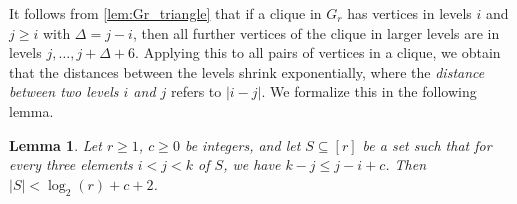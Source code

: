 \documentclass[11pt]{article}
\newtheorem{lemma}[theorem]{Lemma}
\providecommand{\todo}[2][]{}
\begin{document}
%
%
%
It follows from \cref{lem:Gr_triangle} that if a clique in $G_r$ has vertices in levels $ i $ and $ j \geq i $ with $ \Delta = j - i $, then all further vertices of the clique in larger levels are in levels $ j, \dots, j + \Delta + 6 $.
Applying this to all pairs of vertices in a clique, we obtain that the distances between the levels shrink exponentially, where the \emph{distance between two levels $ i $ and $ j $} refers to $ |i - j| $.
We formalize this in the following lemma.
%
\begin{lemma}\label{lem:Gr_clique-levels}
    Let $ r \geq 1 $, $ c \geq 0 $ be integers, and let $ S \subseteq [r] $ be a set such that for every three elements $ i < j < k $ of $ S $, we have $ k - j \leq j - i + c $.
    Then $ |S| < \log_2(r) + c + 2 $.
\end{lemma}
%
\end{document}
